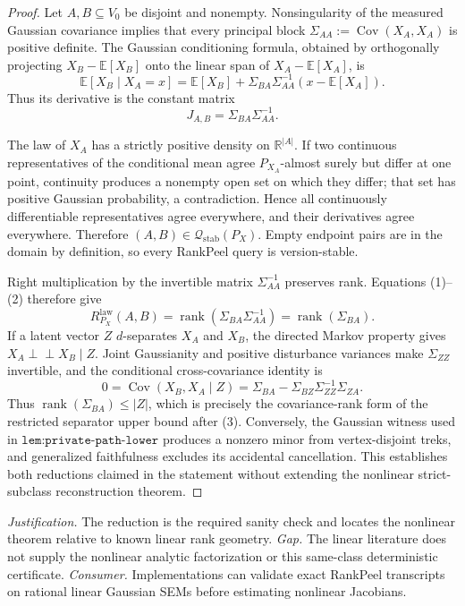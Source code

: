 \documentclass{article}
\begin{document}
\begin{proof}
Let \(A,B\subseteq V_0\) be disjoint and nonempty.  Nonsingularity of the measured Gaussian covariance implies that every principal block \(\Sigma_{AA}:=\operatorname{Cov}(X_A,X_A)\) is positive definite.  The Gaussian conditioning formula, obtained by orthogonally projecting \(X_B-\mathbb E[X_B]\) onto the linear span of \(X_A-\mathbb E[X_A]\), is
\[
 \mathbb E[X_B\mid X_A=x]
 =\mathbb E[X_B]+\Sigma_{BA}\Sigma_{AA}^{-1}(x-\mathbb E[X_A]). \tag{1}
\]
Thus its derivative is the constant matrix
\[
 J_{A,B}=\Sigma_{BA}\Sigma_{AA}^{-1}. \tag{2}
\]

The law of \(X_A\) has a strictly positive density on \(\mathbb R^{|A|}\).  If two continuous representatives of the conditional mean agree \(P_{X_A}\)-almost surely but differ at one point, continuity produces a nonempty open set on which they differ; that set has positive Gaussian probability, a contradiction.  Hence all continuously differentiable representatives agree everywhere, and their derivatives agree everywhere.  Therefore \((A,B)\in\mathcal Q_{\mathrm{stab}}(P_X)\).  Empty endpoint pairs are in the domain by definition, so every RankPeel query is version-stable.

Right multiplication by the invertible matrix \(\Sigma_{AA}^{-1}\) preserves rank.  Equations (1)--(2) therefore give
\[
 R^{\mathrm{law}}_{P_X}(A,B)
 =\operatorname{rank}(\Sigma_{BA}\Sigma_{AA}^{-1})
 =\operatorname{rank}(\Sigma_{BA}). \tag{3}
\]
If a latent vector \(Z\) \(d\)-separates \(X_A\) and \(X_B\), the directed Markov property gives \(X_A\mathbin{\perp\!\!\!\perp}X_B\mid Z\).  Joint Gaussianity and positive disturbance variances make \(\Sigma_{ZZ}\) invertible, and the conditional cross-covariance identity is
\[
 0=\operatorname{Cov}(X_B,X_A\mid Z)
   =\Sigma_{BA}-\Sigma_{BZ}\Sigma_{ZZ}^{-1}\Sigma_{ZA}. \tag{4}
\]
Thus \(\operatorname{rank}(\Sigma_{BA})\leq |Z|\), which is precisely the covariance-rank form of the restricted separator upper bound after (3).  Conversely, the Gaussian witness used in \(\texttt{lem:private-path-lower}\) produces a nonzero minor from vertex-disjoint treks, and generalized faithfulness excludes its accidental cancellation.  This establishes both reductions claimed in the statement without extending the nonlinear strict-subclass reconstruction theorem.
\end{proof}
\par\smallskip\noindent \textit{Justification.} The reduction is the required sanity check and locates the nonlinear theorem relative to known linear rank geometry. \textit{Gap.} The linear literature does not supply the nonlinear analytic factorization or this same-class deterministic certificate. \textit{Consumer.} Implementations can validate exact RankPeel transcripts on rational linear Gaussian SEMs before estimating nonlinear Jacobians.
\end{document}
